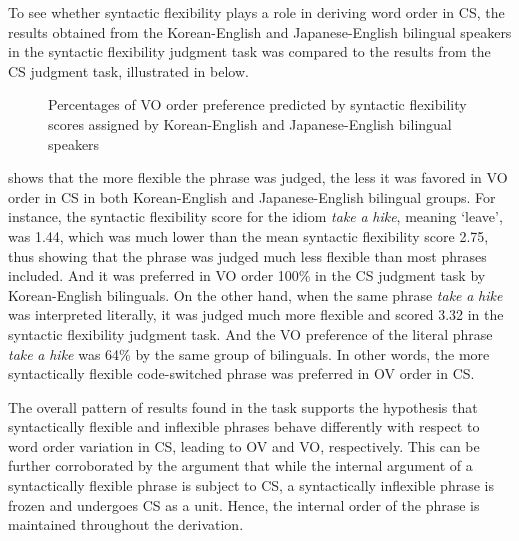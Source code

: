 To see whether syntactic flexibility plays a role in deriving word order in \ac{CS}, the results obtained from the Korean-English and Japanese-English bilingual speakers in the syntactic flexibility judgment task was compared to the results from the \ac{CS} judgment task, illustrated in  below. 

\begin{figure}
\vspace*{2cm}

\caption{Percentages of \ac{VO} order preference predicted by syntactic flexibility scores assigned by Korean-English and Japanese-English bilingual speakers} \label{fig:2.5}
\end{figure}

 shows that the more flexible the phrase was judged, the less it was favored in \ac{VO} order in \ac{CS} in both Korean-English and Japanese-English bilingual groups. For instance, the syntactic flexibility score for the idiom \textit{take} \textit{a} \textit{hike}, meaning ‘leave’, was 1.44, which was much lower than the mean syntactic flexibility score 2.75, thus showing that the phrase was judged much less flexible than most phrases included. And it was preferred in \ac{VO} order 100\% in the \ac{CS} judgment task by Korean-English bilinguals. On the other hand, when the same phrase \textit{take} \textit{a} \textit{hike} was interpreted literally, it was judged much more flexible and scored 3.32 in the syntactic flexibility judgment task. And the \ac{VO} preference of the literal phrase \textit{take} \textit{a} \textit{hike} was 64\% by the same group of bilinguals. In other words, the more syntactically flexible code-switched phrase was preferred in \ac{OV} order in \ac{CS}. 

\newpage
The overall pattern of results found in the task supports the hypothesis that syntactically flexible and inflexible phrases behave differently with respect to word order variation in \ac{CS}, leading to \ac{OV} and \ac{VO}, respectively. This can be further corroborated by the argument that while the internal argument of a syntactically flexible phrase is subject to \ac{CS}, a syntactically inflexible phrase is frozen and undergoes \ac{CS} as a unit. Hence, the internal order of the phrase is maintained throughout the derivation.


